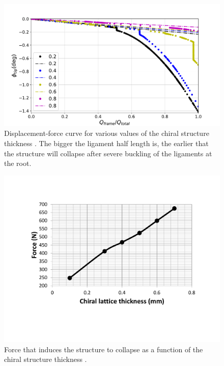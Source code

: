       \begin{figure}[!htpb] %
        \centering
        \includegraphics[width=0.8 \textwidth]{../figures/result-sim/chiral_t/force_displacement-far}
        \caption[Displacement-force curve for various values of the chiral structure thickness]{Displacement-force curve for various values of the chiral structure thickness \chit. The bigger the ligament half length is, the earlier that the structure will collapse after severe buckling of the ligaments at the root.}\label{fig:forceDisplacement-far-chiral-t}
      \end{figure}

      \begin{figure}[!htpb] %
        \centering
        \includegraphics[width=0.8 \textwidth]{../figures/result-sim/chiral_t/force_chiral_t}
        \caption[Force that induces the structure to collapse as a function of the chiral structure thickness]{Force that induces the structure to collapse as a function of the chiral structure thickness \chit.}\label{fig:force_chiral_t}
      \end{figure} 